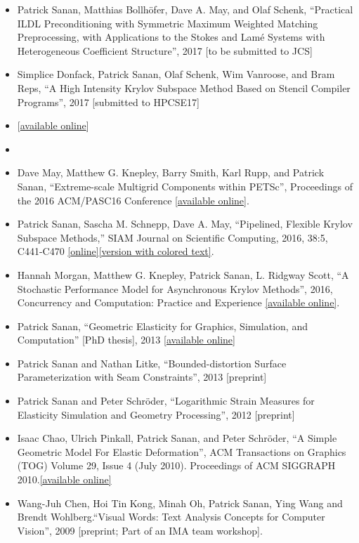\begin{itemize}
\item Patrick Sanan, Matthias Bollh\"{o}fer, Dave A. May, and Olaf Schenk, ``Practical ILDL Preconditioning with Symmetric Maximum Weighted Matching Preprocessing, with Applications to the Stokes and Lam\'{e} Systems with Heterogeneous Coefficient Structure'', 2017 [to be submitted to JCS]
\item Simplice Donfack, Patrick Sanan, Olaf Schenk, Wim Vanroose, and Bram Reps, ``A High Intensity Krylov Subspace Method Based on Stencil Compiler Programs'', 2017 [submitted to HPCSE17]
\item {} [\href{https://arxiv.org/abs/1711.07303}{available online}]
\item {}
\item Dave May, Matthew G. Knepley, Barry Smith, Karl Rupp, and Patrick Sanan, ``Extreme-scale Multigrid Components within PETSc'', Proceedings of the 2016 ACM/PASC16 Conference [\href{http://dl.acm.org/citation.cfm?doid=2929908.2929913}{available online}].
\item Patrick Sanan, Sascha M. Schnepp, Dave A. May, ``Pipelined, Flexible Krylov Subspace Methods,'' SIAM Journal on Scientific Computing, 2016, 38:5, C441-C470 \href{http://dx.doi.org/10.1137/15M1049130}{[online]}\href{http://arxiv.org/abs/1511.07226}{[version with colored text]}.
\item Hannah Morgan, Matthew G. Knepley, Patrick Sanan, L. Ridgway Scott, ``A Stochastic Performance Model for Asynchronous Krylov Methods'', 2016, Concurrency and Computation: Practice and Experience \href{http://onlinelibrary.wiley.com/doi/10.1002/cpe.3820/full}{[available online]}.
\item Patrick Sanan, ``Geometric Elasticity for Graphics, Simulation, and Computation'' [PhD thesis], 2013 \href{http://resolver.caltech.edu/CaltechTHESIS:12052013-121547860}{[available online]}
\item Patrick Sanan and Nathan Litke, ``Bounded-distortion Surface Parameterization with Seam Constraints'', 2013 [preprint]
\item Patrick Sanan and Peter Schr\"{o}der, ``Logarithmic Strain Measures for Elasticity Simulation and Geometry Processing'', 2012 [preprint]
\item Isaac Chao, Ulrich Pinkall, Patrick Sanan, and Peter Schr\"{o}der, ``A Simple Geometric Model For Elastic Deformation'', ACM Transactions on Graphics (TOG) Volume 29, Issue 4 (July 2010). Proceedings of ACM SIGGRAPH 2010.{\href{http://multires.caltech.edu/pubs/GeomElastic.pdf}{[available online]}}
\item Wang-Juh Chen, Hoi Tin Kong, Minah Oh, Patrick Sanan, Ying Wang and Brendt Wohlberg.``Visual Words: Text Analysis Concepts for Computer Vision'', 2009 [preprint; Part of an IMA team workshop].
\end{itemize}
